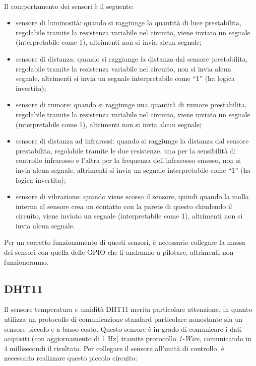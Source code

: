 \documentclass[a4paper,titlepage]{book}
\newcommand{\itema}{\begin{itemize}[noitemsep,topsep=10pt,parsep=5pt,partopsep=10pt]}
\begin{document}
~

Il comportamento dei sensori è il seguente:

\itema

\item sensore di luminosità: quando si raggiunge la quantità di luce prestabilita, regolabile tramite la resistenza variabile nel circuito, viene inviato un segnale (interpretabile come 1), altrimenti non si invia alcun segnale;

\item sensore di distanza: quando si raggiunge la distanza dal sensore prestabilita, regolabile tramite la resistenza variabile nel circuito, non si invia alcun segnale, altrimenti si invia un segnale interpretabile come ``1'' (ha logica invertita);

\item sensore di rumore: quando si raggiunge una quantità di rumore prestabilita, regolabile tramite la resistenza variabile nel circuito, viene inviato un segnale (interpretabile come 1), altrimenti non si invia alcun segnale;

\item sensore di distanza ad infrarossi: quando si raggiunge la distanza dal sensore prestabilita, regolabile tramite le due resistenze, una per la sensibilità di controllo infrarosso e l'altra per la frequenza dell'infrarosso emesso, non si invia alcun segnale, altrimenti si invia un segnale interpretabile come ``1'' (ha logica invertita);

\item sensore di vibrazione: quando viene scosso il sensore, quindi quando la molla interna al sensore crea un contatto con la parete di questo chiudendo il circuito, viene inviato un segnale (interpretabile come 1), altrimenti non si invia alcun segnale.

\end{itemize} 


Per un corretto funzionamento di questi sensori, è necessario collegare la massa dei sensori con quella delle GPIO che li andranno a pilotare, altrimenti non funzioneranno.

\subsection{DHT11}

Il sensore temperatura e umidità DHT11 merita particolare attenzione, in quanto utilizza un protocollo di comunicazione standard particolare nonostante sia un sensore piccolo e a basso costo. Questo sensore è in grado di comunicare i dati acquisiti (con aggiornamento di 1 Hz) tramite protocollo \textit{1-Wire}, comunicando in 4 millisecondi il risultato. Per collegare il sensore all'unità di controllo, è necessario realizzare questo piccolo circuito:
\end{document}
